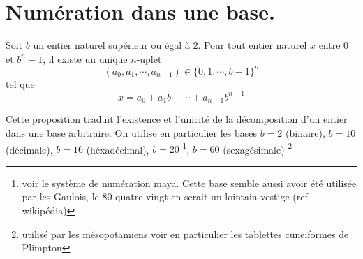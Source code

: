 \section{Numération dans une base.}
\begin{prop}
 Soit $b$ un entier naturel supérieur ou égal à $2$. Pour tout entier naturel $x$ entre $0$ et $b^n-1$, il existe un unique $n$-uplet
\begin{displaymath}
 (a_0,a_1,\cdots,a_{n-1})\in \{0,1,\cdots,b-1\}^n
\end{displaymath}
tel que 
\begin{displaymath}
 x = a_0 + a_1 b +\cdots +a_{n-1}b^{n-1}
\end{displaymath}
\end{prop}
Cette proposition traduit l'existence et l'unicité de la décomposition d'un entier dans une base arbitraire. On utilise en particulier les bases $b=2$ (binaire), $b=10$ (décimale), $b=16$ (héxadécimal), $b=20$ \footnote{voir le système de numération maya. Cette base semble aussi avoir été utilisée par les Gaulois, le 80 quatre-vingt en serait un lointain vestige (ref wikipédia) }, $b=60$ (sexagésimale) \footnote{utilisé par les mésopotamiens voir en particulier les tablettes cuneiformes de Plimpton}
